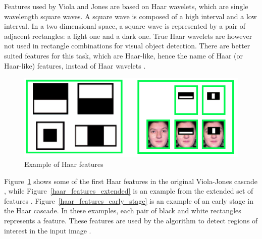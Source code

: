 \vspace{\baselineskip}
\noindent Features used by Viola and Jones are based on Haar wavelets, which are single wavelength square waves. A square wave is composed of a high interval and a low interval. In a two dimensional space, a square wave is represented by a pair of adjacent rectangles: a light one and a dark one. True Haar wavelets are however not used in rectangle combinations for visual object detection. There are better suited features for this task, which are Haar-like, hence the name of Haar (or Haar-like) features, instead of Haar wavelets \cite{HEW07}.
\newline

\begin{figure}[!h]
\begin{center}
\noindent \includegraphics[scale=0.7]{figures/haar_features_first_2_stage} 
\newline
\caption{Example of Haar features}
\label{haar_features_first_2_stage}
\end{center} 
\end{figure}

\noindent Figure~\ref{haar_features_first_2_stage} shows some of the first Haar features in the original Viola-Jones cascade \cite{HEW07}, while Figure~\ref{haar_features_extended} is an example from the extended set of features \cite{DIN08}. Figure~\ref{haar_features_early_stage} is an example of an early stage in the Haar cascade. In these examples, each pair of black and white rectangles represents a feature. These features are used by the algorithm to detect regions of interest in the input image \cite{HAR12}.
\newline

